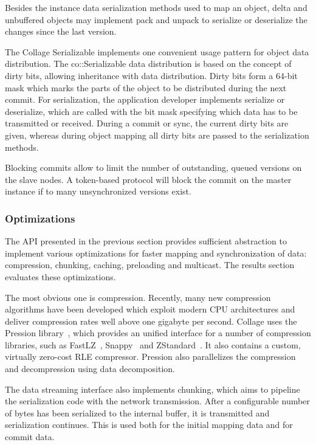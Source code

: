 \documentclass[10pt,journal,compsoc]{IEEEtran}
\begin{document}
Besides the instance data serialization methods used to map an object, delta and
unbuffered objects may implement \textsf{pack} and \textsf{unpack} to serialize
or deserialize the changes since the last version.

\label{sec:Serializable}The Collage Serializable implements one convenient usage
pattern for object data distribution. The \textsf{co::Serializable} data
distribution is based on the concept of dirty bits, allowing inheritance with
data distribution. Dirty bits form a 64-bit mask which marks the parts of the
object to be distributed during the next commit. For serialization, the
application developer implements \textsf{serialize} or \textsf{deserialize},
which are called with the bit mask specifying which data has to be transmitted
or received. During a commit or sync, the current dirty bits are given, whereas
during object mapping all dirty bits are passed to the serialization methods.

Blocking commits allow to limit the number of outstanding, queued versions on
the slave nodes. A token-based protocol will block the commit on the master
instance if to many unsynchronized versions exist.

\subsubsection{Optimizations}

The API presented in the previous section provides sufficient abstraction to
implement various optimizations for faster mapping and synchronization of data:
compression, chunking, caching, preloading and multicast. The results section
evaluates these optimizations.

The most obvious one is compression. Recently, many new compression algorithms
have been developed which exploit modern CPU architectures and deliver
compression rates well above one gigabyte per second. Collage uses the Pression
library~\cite{pression}, which provides an unified interface for a number of
compression libraries, such as FastLZ~\cite{jesperfast}, Snappy~\cite{snappy}
and ZStandard~\cite{zstd}. It also contains a custom, virtually zero-cost RLE
compressor. Pression also parallelizes the compression and decompression using
data decomposition.

The data streaming interface also implements chunking, which aims to pipeline
the serialization code with the network transmission. After a configurable
number of bytes has been serialized to the internal buffer, it is transmitted
and serialization continues. This is used both for the initial mapping data and
for commit data.
\end{document}

